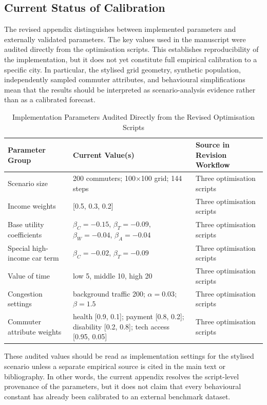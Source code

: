 \subsection{Current Status of Calibration}
The revised appendix distinguishes between implemented parameters and externally validated parameters. The key values used in the manuscript were audited directly from the optimisation scripts. This establishes reproducibility of the implementation, but it does not yet constitute full empirical calibration to a specific city. In particular, the stylised grid geometry, synthetic population, independently sampled commuter attributes, and behavioural simplifications mean that the results should be interpreted as scenario-analysis evidence rather than as a calibrated forecast.

\begin{table}[!ht]
\centering
\caption{Implementation Parameters Audited Directly from the Revised Optimisation Scripts}
\small
\begin{tabularx}{\textwidth}{p{}p{}Y}
\toprule
\textbf{Parameter Group} & \textbf{Current Value(s)} & \textbf{Source in Revision Workflow} \\
\midrule
Scenario size & 200 commuters; 100$\times$100 grid; 144 steps & Three optimisation scripts \\
Income weights & [0.5, 0.3, 0.2] & Three optimisation scripts \\
Base utility coefficients & $\beta_C=-0.15$, $\beta_T=-0.09$, $\beta_W=-0.04$, $\beta_A=-0.04$ & Three optimisation scripts \\
Special high-income car term & $\beta_C=-0.02$, $\beta_T=-0.09$ & Three optimisation scripts \\
Value of time & low 5, middle 10, high 20 & Three optimisation scripts \\
Congestion settings & background traffic 200; $\alpha=0.03$; $\beta=1.5$ & Three optimisation scripts \\
Commuter attribute weights & health [0.9, 0.1]; payment [0.8, 0.2]; disability [0.2, 0.8]; tech access [0.95, 0.05] & Three optimisation scripts \\
\bottomrule
\end{tabularx}
\end{table}

These audited values should be read as implementation settings for the stylised scenario unless a separate empirical source is cited in the main text or bibliography. In other words, the current appendix resolves the script-level provenance of the parameters, but it does not claim that every behavioural constant has already been calibrated to an external benchmark dataset.

